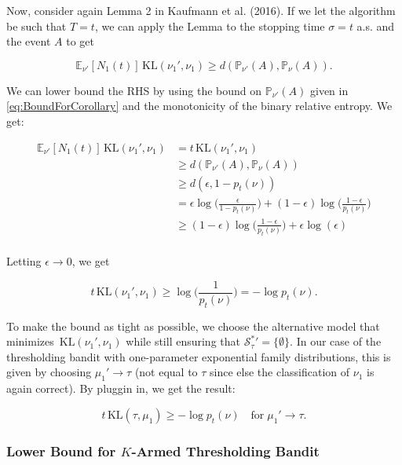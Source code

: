 \documentclass[11pt,]{article}
\newcommand{\KL}{\,\text{KL}}
\begin{document}
Now, consider again Lemma 2 in Kaufmann et al. (2016). If we let the
algorithm be such that \(T = t\), we can apply the Lemma to the stopping
time \(\sigma = t\) a.s. and the event \(A\) to get

\[
\mathbb{E}_{\nu'}[N_1(t)]\KL(\nu_1', \nu_1) \geq d(\mathbb{P}_{\nu'}(A), \mathbb{P}_{\nu}(A)).
\]

We can lower bound the RHS by using the bound on
\(\mathbb{P}_{\nu'}(A)\) given in \eqref{eq:BoundForCorollary} and the
monotonicity of the binary relative entropy. We get:

\begin{align*}
\mathbb{E}_{\nu'}[N_1(t)]\KL(\nu_1', \nu_1) & = t \KL(\nu_1', \nu_1) \\
& \geq d(\mathbb{P}_{\nu'}(A), \mathbb{P}_{\nu}(A)) \\
& \geq d(\epsilon, 1- p_t(\nu)) \\
& = \epsilon \log\Big(\frac{\epsilon}{1-p_t(\nu)}\Big) + (1-\epsilon) \log \Big(\frac{1-\epsilon}{p_t(\nu)}\Big) \\
& \geq (1-\epsilon) \log \Big(\frac{1-\epsilon}{p_t(\nu)}\Big) + \epsilon \log(\epsilon) \\
\end{align*}

Letting \(\epsilon \rightarrow 0\), we get

\[
t \KL(\nu_1', \nu_1) \geq \log \Big(\frac{1}{p_t(\nu)}\Big) = -\log p_t(\nu).
\]

To make the bound as tight as possible, we choose the alternative model
that minimizes \(\KL(\nu_1', \nu_1)\) while still ensuring that
\(\mathcal{S}_{\tau}^* {'} = \{\emptyset\}\). In our case of the
thresholding bandit with one-parameter exponential family distributions,
this is given by choosing \(\mu_1' \rightarrow \tau\) (not equal to
\(\tau\) since else the classification of \(\nu_1\) is again correct).
By pluggin in, we get the result:

\[
t \KL(\tau, \mu_1) \geq -\log p_t(\nu) \quad \text{for} \; \mu_1' \rightarrow \tau.
\]

\subsubsection{\texorpdfstring{Lower Bound for \(K\)-Armed Thresholding
Bandit
\label{sec:corollaryLBKTBPproof}}{Lower Bound for K-Armed Thresholding Bandit }}\label{lower-bound-for-k-armed-thresholding-bandit}
\end{document}

